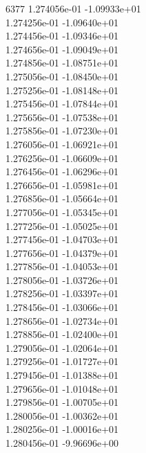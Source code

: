 6377	1.274056e-01	-1.09933e+01	\\ 	1.274256e-01	-1.09640e+01	\\ 	1.274456e-01	-1.09346e+01	\\ 	1.274656e-01	-1.09049e+01	\\ 	1.274856e-01	-1.08751e+01	\\ 	1.275056e-01	-1.08450e+01	\\ 	1.275256e-01	-1.08148e+01	\\ 	1.275456e-01	-1.07844e+01	\\ 	1.275656e-01	-1.07538e+01	\\ 	1.275856e-01	-1.07230e+01	\\ 	1.276056e-01	-1.06921e+01	\\ 	1.276256e-01	-1.06609e+01	\\ 	1.276456e-01	-1.06296e+01	\\ 	1.276656e-01	-1.05981e+01	\\ 	1.276856e-01	-1.05664e+01	\\ 	1.277056e-01	-1.05345e+01	\\ 	1.277256e-01	-1.05025e+01	\\ 	1.277456e-01	-1.04703e+01	\\ 	1.277656e-01	-1.04379e+01	\\ 	1.277856e-01	-1.04053e+01	\\ 	1.278056e-01	-1.03726e+01	\\ 	1.278256e-01	-1.03397e+01	\\ 	1.278456e-01	-1.03066e+01	\\ 	1.278656e-01	-1.02734e+01	\\ 	1.278856e-01	-1.02400e+01	\\ 	1.279056e-01	-1.02064e+01	\\ 	1.279256e-01	-1.01727e+01	\\ 	1.279456e-01	-1.01388e+01	\\ 	1.279656e-01	-1.01048e+01	\\ 	1.279856e-01	-1.00705e+01	\\ 	1.280056e-01	-1.00362e+01	\\ 	1.280256e-01	-1.00016e+01	\\ 	1.280456e-01	-9.96696e+00	\\ \hline
